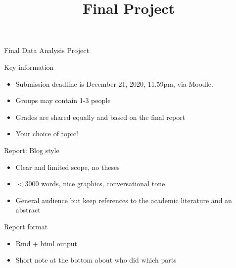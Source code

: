 \documentclass{hertieteaching}
\title{Final Project}
\begin{document}
\maketitle


\begin{frame}{Final Data Analysis Project}

Key information
\begin{itemize}
  \item Submission deadline is December 21, 2020, 11.59pm, via Moodle.
  \item Groups may contain 1-3 people
  \item Grades are shared equally and based on the final report
  \item Your choice of topic!
\end{itemize}

Report: Blog style
\begin{itemize}
  \item Clear and limited scope, no theses
  \item $<$3000 words, nice graphics, conversational tone
  \item General audience but keep references to the academic literature and an abstract
\end{itemize}

Report format
\begin{itemize}
  \item Rmd + html output
  \item Short note at the bottom about who did which parts
\end{itemize}

\end{frame}
\end{document}
